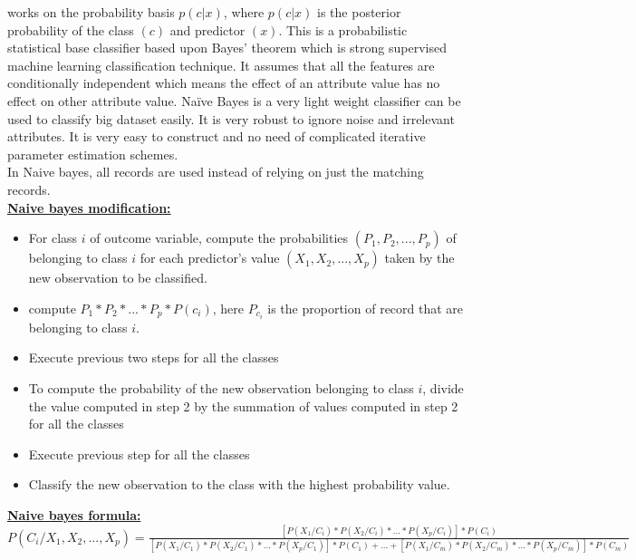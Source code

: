 \documentclass[11pt]{article}
\begin{document}
works on the probability basis $ p(c | x)$, where $p(c | x)$ is the posterior probability of the
class $(c)$ and predictor $(x)$. This is a probabilistic statistical base classifier based upon Bayes’ theorem which is strong supervised machine learning classification technique. It assumes that all the features are 
conditionally independent which means the effect of an attribute value has no effect on other attribute value. Naïve Bayes is a very light weight classifier can be used to classify big dataset easily. It is very robust to ignore noise and irrelevant attributes. It is very easy to construct and no need 
of complicated iterative parameter estimation schemes.\\
In Naive bayes, all records are used instead of relying on just the matching records.\\
\underline{\textbf{Naive bayes modification:}}
\begin{itemize}
\item For class $i$ of outcome variable, compute the probabilities $(P_{1},P_{2},...,P_{p})$ of belonging to class $i$ for each predictor's value $(X_{1},X_{2},...,X_{p})$ taken by the new observation to be classified.
\item compute $P_{1}*P_{2}*...*P_{p}*P(c_{i})$, here $P_{c_{i}}$ is the proportion of record that are belonging to class $i$.
\item Execute previous two steps for all the classes
\item To compute the probability of the new observation belonging to class $i$, divide the value computed in step 2 by the summation of values computed in step 2 for all the classes
\item Execute previous step for all the classes 
\item Classify the new observation to the class with the highest probability value.  
\end{itemize}
\underline{\textbf{Naive bayes formula:}}\\
$P(C_{i}/X_{1},X_{2},...,X_{p})=\frac{[P(X_{1}/C_{i})*P(X_{2}/C_{i})*...*P(X_{p}/C_{i})]*P(C_{i})}{[P(X_{1}/C_{1})*P(X_{2}/C_{1})*...*P(X_{p}/C_{1})]*P(C_{1})+...+[P(X_{1}/C_{m})*P(X_{2}/C_{m})*...*P(X_{p}/C_{m})]*P(C_{m})}$
\end{document}
